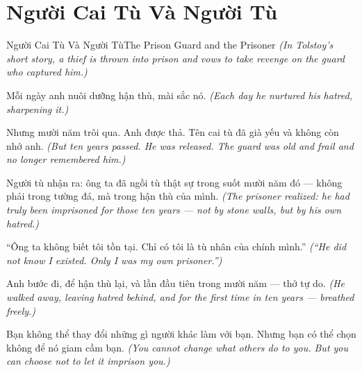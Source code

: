 \section{Người Cai Tù Và Người Tù}
\begin{truyen}{Người Cai Tù Và Người Tù}{The Prison Guard and the Prisoner}
\textit{(In Tolstoy's short story, a thief is thrown into prison and vows to take revenge on the guard who captured him.)}

Mỗi ngày anh nuôi dưỡng hận thù, mài sắc nó.
\textit{(Each day he nurtured his hatred, sharpening it.)}

Nhưng mười năm trôi qua. Anh được thả. Tên cai tù đã già yếu và không còn nhớ anh.
\textit{(But ten years passed. He was released. The guard was old and frail and no longer remembered him.)}

Người tù nhận ra: ông ta đã ngồi tù thật sự trong suốt mười năm đó — không phải trong tường đá, mà trong hận thù của mình.
\textit{(The prisoner realized: he had truly been imprisoned for those ten years — not by stone walls, but by his own hatred.)}

``Ông ta không biết tôi tồn tại. Chỉ có tôi là tù nhân của chính mình.''
\textit{(``He did not know I existed. Only I was my own prisoner.'')}

Anh bước đi, để hận thù lại, và lần đầu tiên trong mười năm — thở tự do.
\textit{(He walked away, leaving hatred behind, and for the first time in ten years — breathed freely.)}

\end{truyen}

\begin{baihoc}
Bạn không thể thay đổi những gì người khác làm với bạn. Nhưng bạn có thể chọn không để nó giam cầm bạn.
\textit{(You cannot change what others do to you. But you can choose not to let it imprison you.)}
\end{baihoc}
\ngancach

